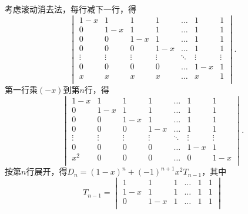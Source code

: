 \documentclass[12pt,fontset=fandol]{ctexart}
\begin{document}
\begin{solve}
考虑滚动消去法，每行减下一行，得
            \[ \begin{vmatrix}
                    1-x    & 1      & 1      & 1      & \ldots & 1      & 1      \\
                    0      & 1-x    & 1      & 1      & \ldots & 1      & 1      \\
                    0      & 0      & 1-x    & 1      & \ldots & 1      & 1      \\
                    0      & 0      & 0      & 1-x    & \ldots & 1      & 1      \\
                    \vdots & \vdots & \vdots & \vdots & \ddots & \vdots & \vdots \\
                    0      & 0      & 0      & 0      & \ldots & 1-x    & 1      \\
                    x      & x      & x      & x      & \ldots & x      & 1      \\
                \end{vmatrix}. \]
            第一行乘$(-x)$到第$n$行，得
            \[\begin{vmatrix}
                    1-x    & 1      & 1      & 1      & \ldots & 1      & 1      \\
                    0      & 1-x    & 1      & 1      & \ldots & 1      & 1      \\
                    0      & 0      & 1-x    & 1      & \ldots & 1      & 1      \\
                    0      & 0      & 0      & 1-x    & \ldots & 1      & 1      \\
                    \vdots & \vdots & \vdots & \vdots & \ddots & \vdots & \vdots \\
                    0      & 0      & 0      & 0      & \ldots & 1-x    & 1      \\
                    x^2    & 0      & 0      & 0      & \ldots & 0      & 1-x    \\
                \end{vmatrix}.\]
            按第$n$行展开，得$D_n=(1-x)^n+(-1)^{n+1}x^2T_{n-1}$，其中
            \[T_{n-1}=\begin{vmatrix}
                    1      & 1      & 1      & \ldots & 1      & 1      \\
                    1-x    & 1      & 1      & \ldots & 1      & 1      \\
                    0      & 1-x    & 1      & \ldots & 1      & 1      \\

\end{vmatrix}\]
\end{solve}
\end{document}

